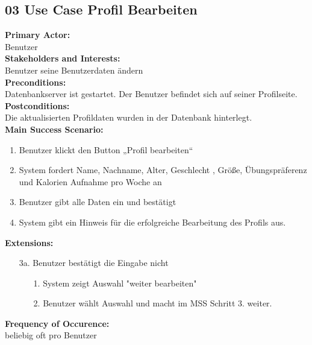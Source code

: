 \documentclass[12pt,a4paper,onecolumn]{article}
\begin{document}
\subsection{03 Use Case Profil Bearbeiten}
\textbf{Primary Actor:}\\ Benutzer\\
\textbf{Stakeholders and Interests:}\\
Benutzer seine Benutzerdaten ändern\\
\textbf{Preconditions:} \\ Datenbankserver ist gestartet. Der Benutzer befindet sich auf seiner Profilseite.\\
\textbf{Postconditions:}\\ Die aktualisierten Profildaten wurden in der Datenbank hinterlegt.\\
\textbf{Main Success Scenario:}
\begin{enumerate}
    \item Benutzer klickt den Button „Profil bearbeiten“
    \item System fordert Name, Nachname, Alter, Geschlecht , Größe, Übungspräferenz und Kalorien Aufnahme pro Woche an
    \item Benutzer gibt alle Daten ein und bestätigt
    \item System gibt ein Hinweis für die erfolgreiche Bearbeitung des Profils aus.
\end{enumerate}
\textbf{Extensions:}\\
\begin{enumerate}
    \item [3a.]Benutzer bestätigt die Eingabe nicht %
    \begin{enumerate}
        \item [1.]System zeigt Auswahl "weiter bearbeiten"\\
        \item [2.]Benutzer wählt Auswahl und macht im MSS Schritt 3. weiter.\\
    \end{enumerate}
\end{enumerate} 
\textbf{Frequency of Occurence:}\\ beliebig oft pro Benutzer\\
\end{document}
